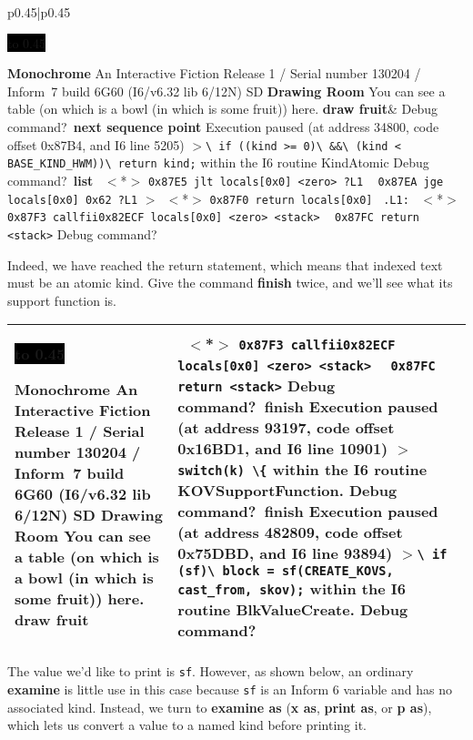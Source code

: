 \documentclass{book}
\newcommand{\n}{\hspace*{\fill}\newline}
\newcommand{\terp}[2]{\begin{center}\begin{tabular}{p{0.45\textwidth}|p{0.45\textwidth}}\midrule #1&#2\\\midrule\end{tabular}\end{center}}
\newcommand{\glkheading}[1]{\textbf{#1}}
\newcommand{\glkinput}[1]{\textbf{#1}}
\newcommand{\glkstatusline}[2]{\centerline{\colorbox{black}{\hbox to 0.45\textwidth{\textcolor{white}{#1\hfil #2}}}}}
\newcommand{\storyprompt}{\raisebox{1.5pt}{\(>\)}}
\newcommand{\cursor}{\raisebox{-1.5pt}{\RectangleThin}}
\newcommand{\markedindent}{\(>\)}
\newcommand{\markeddip}{\(>\)\ }
\newcommand{\unmarkeddip}{\hphantom{\(>\)}\ }
\newcommand{\unmarkeddipb}{\ \hphantom{\(>\)}}
\begin{document}
\terp{\glkstatusline{Drawing Room}{0/1}\n
  \glkheading{Monochrome}\n
  An Interactive Fiction\n
  Release 1 / Serial number 130204 / Inform~7 build 6G60 (I6/v6.32 lib 6/12N) SD\n
  \n
  \glkheading{Drawing Room}\n
  You can see a table (on which is a bowl (in which is some fruit)) here.\n
  \n
  \storyprompt\glkinput{draw fruit}}{%
  \n
  Debug command?\ \glkinput{next sequence point}\n
  \n
  Execution paused (at address 34800, code offset 0x87B4, and I6 line 5205)\n
  \markedindent \lstinline{\ if ((kind >= 0)}\lstinline{\ &&}\lstinline{\ (kind < BASE_KIND_HWM))}\lstinline{\ return kind;}\n
  within the I6 routine KindAtomic\n
  \n
  Debug command?\ \glkinput{list}\n
  \n
  \unmarkeddip \(<\)*\(>\) \lstinline{0x87E5 jlt locals[0x0] <zero> ?L1}\n
  \unmarkeddip \hphantom{\(<\)*\(>\)} \lstinline{0x87EA jge locals[0x0] 0x62 ?L1}\n
  \markeddip \(<\)*\(>\) \lstinline{0x87F0 return locals[0x0]}\n
  \unmarkeddip \lstinline{.L1:}\n
  \unmarkeddip \(<\)*\(>\) \lstinline @0x87F3 callfii@\hfill\lstinline @0x82ECF locals[0x0] <zero> <stack>@\n
  \unmarkeddip \hphantom{\(<\)*\(>\)} \lstinline{0x87FC return <stack>}\n
  \n
  Debug command?\ \cursor}

Indeed, we have reached the return statement, which means that indexed text must
be an atomic kind.  Give the command \glkinput{finish} twice, and we'll see what
its support function is.

\terp{\glkstatusline{Drawing Room}{0/1}\n
  \glkheading{Monochrome}\n
  An Interactive Fiction\n
  Release 1 / Serial number 130204 / Inform~7 build 6G60 (I6/v6.32 lib 6/12N) SD\n
  \n
  \glkheading{Drawing Room}\n
  You can see a table (on which is a bowl (in which is some fruit)) here.\n
  \n
  \storyprompt\glkinput{draw fruit}}{%
  \unmarkeddipb \(<\)*\(>\) \lstinline @0x87F3 callfii@\hfill\lstinline @0x82ECF locals[0x0] <zero> <stack>@\n
  \unmarkeddip \hphantom{\(<\)*\(>\)} \lstinline{0x87FC return <stack>}\n
  \n
  Debug command?\ \glkinput{finish}\n
  \n
  Execution paused (at address 93197, code offset 0x16BD1, and I6 line 10901)\n
  \markedindent \lstinline @switch(k) \{@\n
  within the I6 routine KOVSupportFunction.\n
  \n
  Debug command?\ \glkinput{finish}\n
  \n
  Execution paused (at address 482809, code offset 0x75DBD, and I6 line 93894)\n
  \markedindent \lstinline{\ if (sf)}\lstinline{\ block = sf(CREATE_KOVS, cast_from, skov);}\n
  within the I6 routine BlkValueCreate.\n
  \n
  Debug command?\ \cursor}

The value we'd like to print is \lstinline{sf}.  However, as shown below, an
ordinary \glkinput{examine} is little use in this case because \lstinline{sf} is
an Inform 6 variable and has no associated kind.  Instead, we turn to
\glkinput{examine as} (\glkinput{x as}, \glkinput{print as}, or \glkinput{p
  as}), which lets us convert a value to a named kind before printing it.
\end{document}
